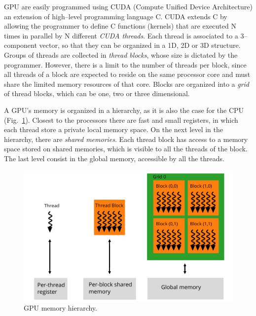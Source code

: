 GPU are easily programmed using CUDA (Compute Unified Device Architecture) an extension of high--level programming language C. CUDA extends C by allowing the programmer to define C functions (kernels) that are executed N times in parallel by N different \textit{CUDA threads}. Each thread is associated to a 3--component vector, so that they can be organized in a 1D, 2D or 3D structure. Groups of threads are collected in \textit{thread blocks}, whose size is dictated by the programmer. However, there is a limit to the number of threads per block, since all threads of a block are expected to reside on the same processor core and must share the limited memory resources of that core. Blocks are organized into a \textit{grid} of thread blocks, which can be one, two or three dimensional.

A GPU's memory is organized in a hierarchy, as it is also the case for the CPU (Fig.~\ref{fig:GPU-memory-hierarchy}). Closest to the processors there are fast and small registers, in which each thread store a private local memory space. On the next level in the hierarchy, there are \textit{shared memories}. Each thread block has access to a memory space stored on shared memories, which is visible to all the threads of the block. The last level consist in the global memory, accessible by all the threads.
\begin{figure}
   \centering
   \includegraphics[width=12cm]{Figs/GPU-memory-hierarchy.pdf}
   \caption{GPU memory hierarchy.} \label{fig:GPU-memory-hierarchy}
\end{figure}


